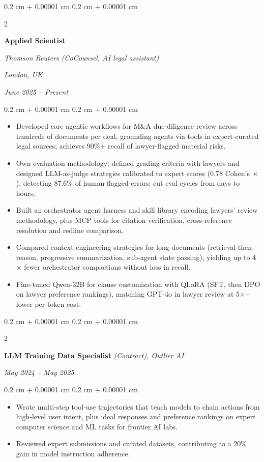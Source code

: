 \documentclass[10.5pt, letterpaper]{article}
\newenvironment{highlights}{
    \begin{itemize}[
        topsep=0.03cm, %
        parsep=0.03cm, %
        partopsep=0pt, %
        itemsep=0.08cm, %
        leftmargin=0.4cm %
    ]
}{
    \end{itemize}
}
\newenvironment{onecolentry}{
    \begin{adjustwidth}{
        0.2 cm + 0.00001 cm
    }{
        0.2 cm + 0.00001 cm
    }
}{
    \end{adjustwidth}
} %
\newenvironment{twocolentry}[2][]{
    \onecolentry
    \def\secondColumn{#2}
    \setcolumnwidth{\fill, 4.5 cm}
    \begin{paracol}{2}
}{
    \switchcolumn \raggedleft \secondColumn
    \end{paracol}
    \endonecolentry
} %
\begin{document}
        \begin{twocolentry}{
        \textit{London, UK}   
            
        \textit{June 2025 – Present}}
            \textbf{Applied Scientist}

            \textit{Thomson Reuters (CoCounsel, AI legal assistant)}
        \end{twocolentry}
\vspace{0.05 cm}
        \begin{onecolentry}
            \begin{highlights}
                \item Developed core agentic workflows for M\&A due-diligence review across hundreds of documents per deal, grounding agents via tools in expert-curated legal sources; achieves 90\%+ recall of lawyer-flagged material risks.
                \item Own evaluation methodology: defined grading criteria with lawyers and designed LLM-as-judge strategies calibrated to expert scores (0.78 \mbox{Cohen's}~$\kappa$), detecting 87.6\% of human-flagged errors; cut eval cycles from days to hours.
                \item Built an orchestrator agent harness and skill library encoding lawyers' review methodology, plus MCP tools for citation verification, cross-reference resolution and redline comparison.
                \item Compared context-engineering strategies for long documents (retrieval-then-reason, progressive summarization, sub-agent state passing), yielding up to 4$\times$ fewer orchestrator compactions without loss in recall.
                \item Fine-tuned Qwen-32B for clause customization with QLoRA (SFT, then DPO on lawyer preference rankings), matching GPT-4o in lawyer review at 5$\times$+ lower per-token cost.
            \end{highlights}
        \end{onecolentry}

\vspace{0.25 cm}

        \begin{twocolentry}{
        \textit{May 2024 – May 2025}}
            \textbf{LLM Training Data Specialist} \textit{(Contract), Outlier AI}
        \end{twocolentry}
\vspace{0.06 cm}
        \begin{onecolentry}
            \begin{highlights}
                \item Wrote multi-step tool-use trajectories that teach models to chain actions from high-level user intent, plus ideal responses and preference rankings on expert computer science and ML tasks for frontier AI labs.
                \item Reviewed expert submissions and curated datasets, contributing to a 20\% gain in model instruction adherence.
            \end{highlights}
        \end{onecolentry}
\end{document}
